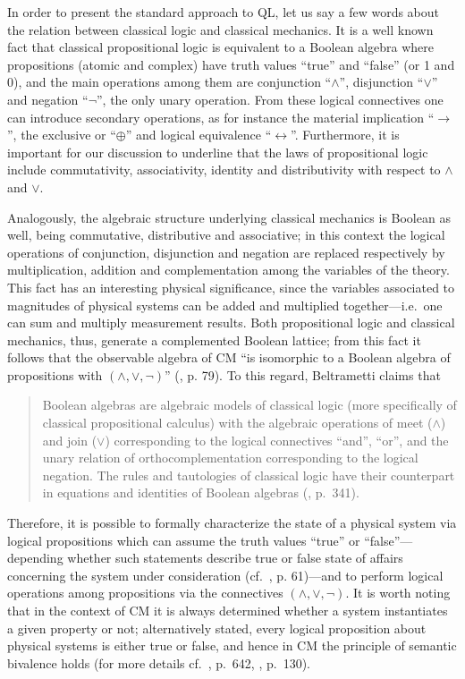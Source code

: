 \documentclass[11pt, executivepaper]{article}
\begin{document}
In order to present the standard approach to QL, let us say a few words about the relation between classical logic and classical mechanics. It is a well known fact that classical propositional logic is equivalent to a Boolean algebra where propositions (atomic and complex) have truth values ``true'' and ``false'' (or 1 and 0), and the main operations among them are conjunction ``$\wedge$'', disjunction ``$\vee$'' and negation ``$\neg$'', the only unary operation. From these logical connectives one can introduce secondary operations, as for instance the material implication ``$\longrightarrow$'', the exclusive or ``$\oplus$'' and logical equivalence ``$\longleftrightarrow$''. Furthermore, it is important for our discussion to underline that the laws of propositional logic include commutativity, associativity, identity and distributivity with respect to $\wedge$ and $\vee$.

Analogously, the algebraic structure underlying classical mechanics is Boolean as well, being commutative, distributive and associative; in this context the logical operations of conjunction, disjunction and negation are replaced respectively by multiplication, addition and complementation among the variables of the theory. This fact has an interesting physical significance, since the variables associated to magnitudes of physical systems can be added and multiplied together---i.e.\ one can sum and multiply measurement results. Both propositional logic and classical mechanics, thus, generate a complemented Boolean lattice; from this fact it follows that the observable algebra of CM ``is isomorphic to a Boolean algebra of propositions with $(\wedge, \vee, \neg)$'' (\cite{David:2015}, p. 79).
To this regard, Beltrametti claims that 
\begin{quote}
Boolean algebras are algebraic models of classical logic (more specifically of classical propositional calculus) with the algebraic operations of meet ($\wedge$) and join ($\vee$) corresponding to the logical connectives ``and'', ``or'', and the unary relation of orthocomplementation corresponding to the logical negation. The rules and tautologies of classical logic have their counterpart in equations and identities of Boolean algebras (\cite{Beltrametti:2004}, p.\ 341). 
\end{quote}

Therefore, it is possible to formally characterize the state of a physical system via logical propositions which can assume the truth values ``true'' or ``false''---depending whether such statements describe true or false state of affairs concerning the system under consideration (cf.\ \cite{Jaeger:2009}, p. 61)---and to perform logical operations among propositions via the connectives $(\wedge, \vee, \neg)$. It is worth noting that in the context of CM it is always determined whether a system instantiates a given property or not; alternatively stated, every logical proposition about physical systems is either true or false, and hence in CM the principle of semantic bivalence holds (for more details cf.\ \cite{Bub:2007}, p.\ 642, \cite{Giuntini:2002}, p.\ 130).
 
\end{document}
